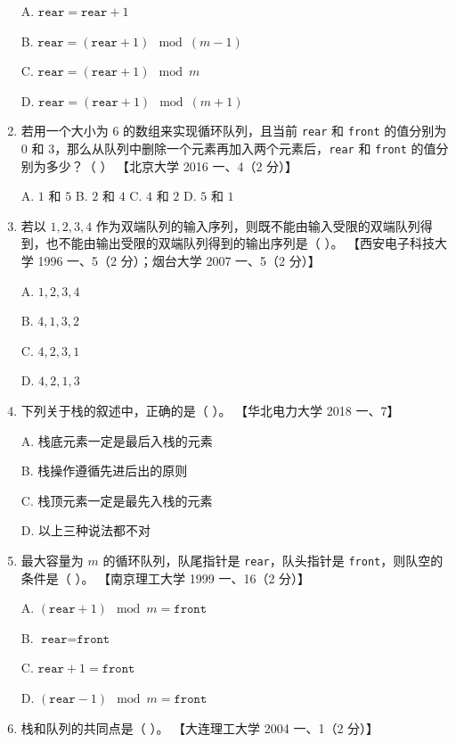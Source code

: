 \documentclass[lang=cn,newtx,10pt,scheme=chinese]{../../elegantbook}
\begin{document}
\begin{enumerate}
    A. $\texttt{rear} = \texttt{rear} + 1$  

    B. $\texttt{rear} = (\texttt{rear} + 1) \mod (m - 1)$  

    C. $\texttt{rear} = (\texttt{rear} + 1) \mod m$  

    D. $\texttt{rear} = (\texttt{rear} + 1) \mod (m + 1)$  

    \item 若用一个大小为 6 的数组来实现循环队列，且当前 \texttt{rear} 和 \texttt{front} 的值分别为 $0$ 和 $3$，那么从队列中删除一个元素再加入两个元素后，\texttt{rear} 和 \texttt{front} 的值分别为多少？（ ）  
    【北京大学 2016 一、4（2 分）】  

    A. $1$ 和 $5$ \quad B. $2$ 和 $4$ \quad C. $4$ 和 $2$ \quad D. $5$ 和 $1$  

    \item 若以 $1, 2, 3, 4$ 作为双端队列的输入序列，则既不能由输入受限的双端队列得到，也不能由输出受限的双端队列得到的输出序列是（ ）。  
    【西安电子科技大学 1996 一、5（2 分）；烟台大学 2007 一、5（2 分）】  

    A. $1, 2, 3, 4$  

    B. $4, 1, 3, 2$  

    C. $4, 2, 3, 1$  

    D. $4, 2, 1, 3$  

    \item 下列关于栈的叙述中，正确的是（ ）。  
    【华北电力大学 2018 一、7】  

    A. 栈底元素一定是最后入栈的元素  

    B. 栈操作遵循先进后出的原则  

    C. 栈顶元素一定是最先入栈的元素  

    D. 以上三种说法都不对  

    \item 最大容量为 $m$ 的循环队列，队尾指针是 \texttt{rear}，队头指针是 \texttt{front}，则队空的条件是（ ）。  
    【南京理工大学 1999 一、16（2 分）】  

    A. $(\texttt{rear} + 1) \mod m = \texttt{front}$  

    B. $\texttt{rear} = \texttt{front}$  

    C. $\texttt{rear} + 1 = \texttt{front}$  

    D. $(\texttt{rear} - 1) \mod m = \texttt{front}$  

    \item 栈和队列的共同点是（ ）。  
    【大连理工大学 2004 一、1（2 分）】  


\end{enumerate}
\end{document}
